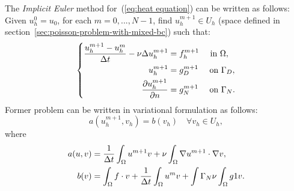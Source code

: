 \documentclass[12pt]{article}
\begin{document}
The \textit{Implicit Euler} method for~(\ref{eq:heat equation}) can be
written as follows:
Given $u^0_h=u_0$, for each $m=0,...,N-1$, find $u^{m+1}_h\in U_h$ (space
defined in section~\ref{sec:poisson-problem-with-mixed-bc}) such that:
\begin{equation}
  \label{eq:euler-implicit-heat-equation}
  \left\{
    \begin{aligned}
      \frac{u^{m+1}_h-u^m_h}{\Delta t} -\nu\Delta u^{m+1}_h &= f^{m+1}_h \quad \text{ in } \Omega, \\
      u^{m+1}_h &= g_D^{m+1} \quad \text{ on } \Gamma_D, \\
      \frac{\partial u^{m+1}_h}{\partial n} &= g_N^{m+1} \quad \text{ on } \Gamma_N.
    \end{aligned}
    \right.
\end{equation}
Former problem can be written in variational formulation as follows:
\begin{equation*}
  a(u^{m+1}_h,v_h) = b(v_h) \quad \forall v_h\in U_h,
\end{equation*}
where
\begin{equation*}
    \begin{aligned}
      a(u,v)&=\frac{1}{\Delta t} \int_\Omega u^{m+1} v + \nu\int_\Omega \nabla
      u^{m+1} \cdot \nabla v,
      \\
      b(v)  &= \int_\Omega f \cdot v
      +\frac{1}{\Delta t} \int_\Omega  u^{m} v
      +\int{\Gamma_N} \nu\int_\Omega g1 v.
    \end{aligned}
\end{equation*}
\end{document}
